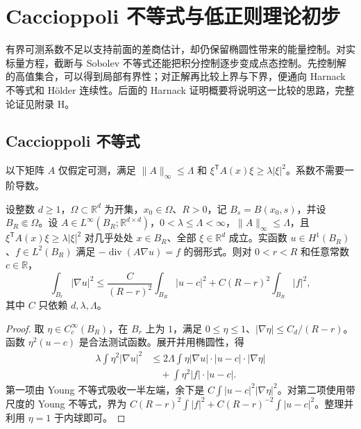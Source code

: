 \section{Caccioppoli 不等式与低正则理论初步}
\label{b2:sec:1604}

有界可测系数不足以支持前面的差商估计，却仍保留椭圆性带来的能量控制。对实标量方程，截断与 Sobolev 不等式还能把积分控制逐步变成点态控制。先控制解的高值集合，可以得到局部有界性；对正解再比较上界与下界，便通向 Harnack 不等式和 Hölder 连续性。后面的 Harnack 证明概要将说明这一比较的思路，完整论证见附录 H。

\subsection{Caccioppoli 不等式}
\label{b2:subsec:160401}

以下矩阵 \(A\) 仅假定可测，满足 \(\lVert A\rVert_\infty\le\Lambda\) 和 \(\xi^{\mathsf T}A(x)\xi\ge\lambda|\xi|^2\)。系数不需要一阶导数。

\begin{proposition}[内部能量估计]
\label{b2:prop:16-caccioppoli}
设整数 \(d\geq1\)，\(\Omega\subset\mathbb R^d\) 为开集，\(x_0\in\Omega\)、\(R>0\)，记 \(B_s=B(x_0,s)\)，并设 \(B_R\Subset\Omega\)。设 \(A\in L^\infty(B_R;\mathbb R^{d\times d})\)，\(0<\lambda\leq\Lambda<\infty\)，\(\|A\|_\infty\leq\Lambda\)，且 \(\xi^{\mathsf T}A(x)\xi\geq\lambda|\xi|^2\) 对几乎处处 \(x\in B_R\)、全部 \(\xi\in\mathbb R^d\) 成立。实函数 \(u\in H^1(B_R)\)、\(f\in L^2(B_R)\) 满足 \(-\operatorname{div}(A\nabla u)=f\) 的弱形式。则对 \(0<r<R\) 和任意常数 \(c\in\mathbb R\)，
\[
 \int_{B_r}|\nabla u|^2\le
 \frac{C}{(R-r)^2}\int_{B_R}|u-c|^2
       +C(R-r)^2\int_{B_R}|f|^2,
\]
其中 \(C\) 只依赖 \(d,\lambda,\Lambda\)。
\end{proposition}
\begin{proof}
取 \(\eta\in C_c^\infty(B_R)\)，在 \(B_r\) 上为 \(1\)，满足 \(0\le\eta\le1\)、\(|\nabla\eta|\le C_d/(R-r)\)。函数 \(\eta^2(u-c)\) 是合法测试函数。展开并用椭圆性，得
\[
 \begin{aligned}
 \lambda\int\eta^2|\nabla u|^2
 &\le2\Lambda\int\eta|\nabla u|\cdot|u-c|\cdot|\nabla\eta|\\
 &\quad+\int\eta^2|f|\cdot|u-c|.
 \end{aligned}
\]
第一项由 Young 不等式吸收一半左端，余下是 \(C\int|u-c|^2|\nabla\eta|^2\)。对第二项使用带尺度的 Young 不等式，界为 \(C(R-r)^2\int|f|^2+C(R-r)^{-2}\int|u-c|^2\)。整理并利用 \(\eta=1\) 于内球即可。
\end{proof}

